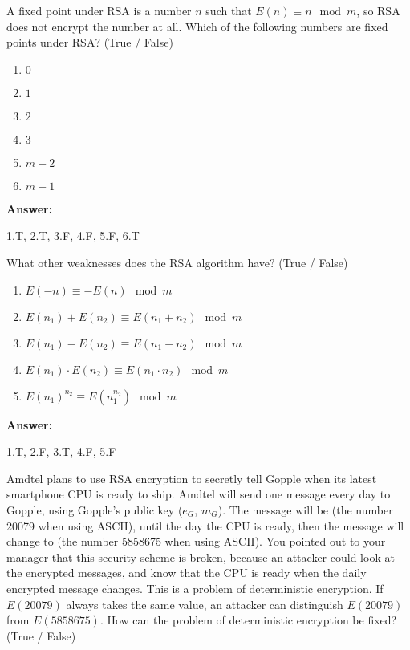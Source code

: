\documentclass[12pt,twoside]{article}
\newcommand{\answer}{
 \par\medskip
 \textbf{Answer:}
}
\newcommand{\answerIId}{ \answer
1.T, 2.T, 3.F, 4.F, 5.F, 6.T
}
\newcommand{\answerIIe}{ \answer
1.T, 2.F, 3.T, 4.F, 5.F
}
\begin{document}
\begin{problems}
\begin {problemparts}
\problempart {} A fixed point under RSA is a number $n$ such that $E(n)
\equiv n \mod m$, so RSA does not encrypt the number at all. Which of the
following numbers are fixed points under RSA? (True / False)
\begin{enumerate}
  \item $0$
  \item $1$
  \item $2$
  \item $3$
  \item $m - 2$
  \item $m - 1$
\end{enumerate}
\answerIId
  
\problempart {} What other weaknesses does the RSA algorithm have?
(True / False)
\begin{enumerate}
  \item $E(-n) \equiv -E(n) \mod m$
  \item $E(n_1) + E(n_2) \equiv E(n_1 + n_2) \mod m$
  \item $E(n_1) - E(n_2) \equiv E(n_1 - n_2) \mod m$
  \item $E(n_1) \cdot E(n_2) \equiv E(n_1 \cdot n_2) \mod m$
  \item $E(n_1)^{n_2} \equiv E(n_1 ^ {n_2}) \mod m$
\end{enumerate}
\answerIIe

\problempart {} Amdtel plans to use RSA encryption to secretly tell
Gopple when its latest smartphone CPU is ready to ship. Amdtel will send one
message every day to Gopple, using Gopple's public key ($e_G$, $m_G$). The
message will be  (the number 20079 when using ASCII), until the day
the CPU is ready, then the message will change to  (the number
5858675 when using ASCII). You pointed out to your manager that this security
scheme is broken, because an attacker could look at the encrypted messages, and
know that the CPU is ready when the daily encrypted message changes. This is a
problem of deterministic encryption. If $E(20079)$ always takes the same value,
an attacker can distinguish $E(20079)$ from $E(5858675)$. How can the problem of
deterministic encryption be fixed? (True / False)


\end{problemparts}
\end{problems}
\end{document}
